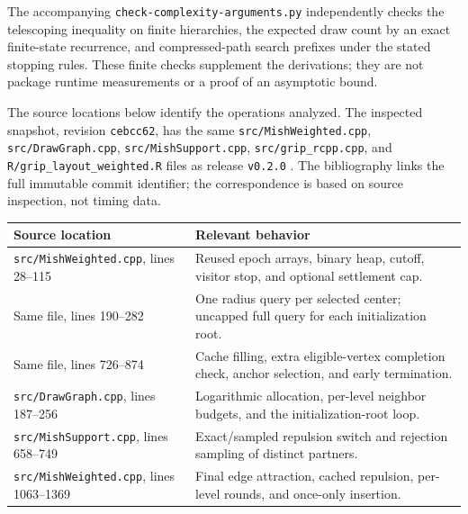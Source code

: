 \documentclass[11pt,a4paper]{article}
\newcommand{\code}[1]{\texttt{#1}}
\begin{document}
The accompanying \nolinkurl{check-complexity-arguments.py} independently checks
the telescoping inequality on finite hierarchies, the expected draw count by
an exact finite-state recurrence, and compressed-path search prefixes under
the stated stopping rules. These finite checks supplement the derivations;
they are not package runtime measurements or a proof of an asymptotic bound.

The source locations below identify the operations analyzed. The inspected
snapshot, revision \code{cebcc62}, has the same
\nolinkurl{src/MishWeighted.cpp}, \nolinkurl{src/DrawGraph.cpp},
\nolinkurl{src/MishSupport.cpp}, \nolinkurl{src/grip_rcpp.cpp}, and
\nolinkurl{R/grip_layout_weighted.R} files as release \code{v0.2.0}
\citep{gripcode2026}. The bibliography links the full immutable commit
identifier; the correspondence is based on source inspection, not timing data.

\begin{center}
\small
\begin{tabularx}{\textwidth}{@{}p{}X@{}}
\toprule
Source location & Relevant behavior \\
\midrule
\nolinkurl{src/MishWeighted.cpp}, lines 28--115
& Reused epoch arrays, binary heap, cutoff, visitor stop, and optional settlement cap. \\
\addlinespace
Same file, lines 190--282
& One radius query per selected center; uncapped full query for each initialization root. \\
\addlinespace
Same file, lines 726--874
& Cache filling, extra eligible-vertex completion check, anchor selection, and early termination. \\
\addlinespace
\nolinkurl{src/DrawGraph.cpp}, lines 187--256
& Logarithmic allocation, per-level neighbor budgets, and the initialization-root loop. \\
\addlinespace
\nolinkurl{src/MishSupport.cpp}, lines 658--749
& Exact/sampled repulsion switch and rejection sampling of distinct partners. \\
\addlinespace
\nolinkurl{src/MishWeighted.cpp}, lines 1063--1369
& Final edge attraction, cached repulsion, per-level rounds, and once-only insertion. \\
\bottomrule
\end{tabularx}
\end{center}



\end{document}
